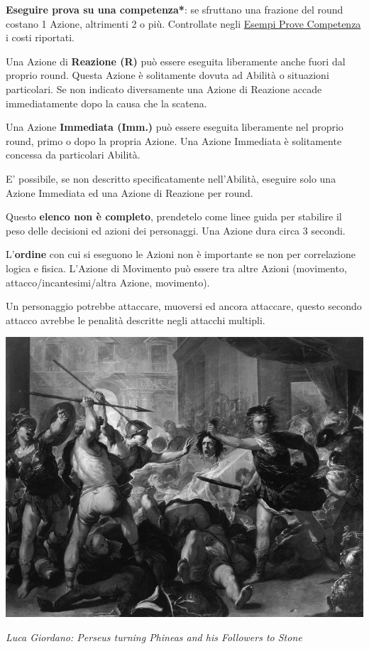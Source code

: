 \begin{multicols}{2}
\textbf{Eseguire prova su una competenza*}: se sfruttano una frazione del round costano 1 Azione, altrimenti 2 o più. Controllate negli \hyperlink{esempiprovecompetenze}{Esempi Prove Competenza} i costi riportati.

Una Azione di \textbf{Reazione (R)} può essere eseguita liberamente anche fuori dal proprio round. Questa Azione è solitamente dovuta ad Abilità o situazioni particolari. Se non indicato diversamente una Azione di Reazione accade immediatamente dopo la causa che la scatena.

Una Azione \textbf{Immediata (Imm.)} può essere eseguita liberamente nel proprio round, primo o dopo la propria Azione. Una Azione Immediata è solitamente concessa da particolari Abilità.

E' possibile, se non descritto specificatamente nell'Abilità, eseguire solo una Azione Immediata ed una Azione di Reazione per round.

\smallskip

Questo \textbf{elenco non è completo}, prendetelo come linee guida per stabilire il peso delle decisioni ed azioni dei personaggi. Una Azione dura circa 3 secondi.

L'\textbf{ordine} con cui si eseguono le Azioni non è importante se non per correlazione logica e fisica. L'Azione di Movimento può essere tra altre Azioni (movimento, attacco/incantesimi/altra Azione, movimento).

Un personaggio potrebbe attaccare, muoversi ed ancora attaccare, questo secondo attacco avrebbe le penalità descritte negli attacchi multipli.

\end{multicols}

\vfill


\begin{center}

\includegraphics[width=0.8\linewidth]{immagini/Perseus_Fighting_Phineus_and_his_Companions.png}

	\emph{Luca Giordano: Perseus turning Phineas and his Followers to Stone}

\end{center}

